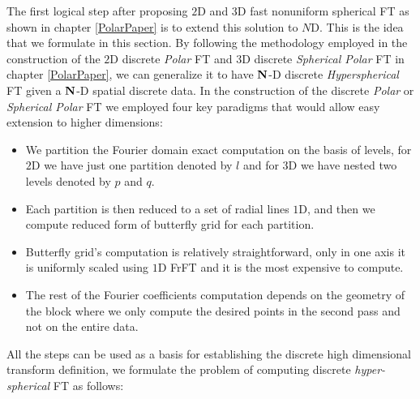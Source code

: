 \documentclass{UCF_ETD}
\begin{document}
The first logical step after proposing $2$D and $3$D fast nonuniform spherical FT as shown in chapter \ref{PolarPaper} is to extend this solution to $N$D. This is the idea that we formulate in this section. By following the methodology employed in the construction of the $2$D discrete \emph{Polar} FT and $3$D discrete \emph{Spherical Polar} FT in chapter \ref{PolarPaper}, we can generalize it to have ${\bf N}$-D discrete \emph{Hyperspherical} FT given a ${\bf N}$-D spatial discrete data. In the construction of the discrete \emph{Polar} or \emph{Spherical Polar} FT we employed four key paradigms that would allow easy extension to higher dimensions:
\begin{itemize}
\item We partition the Fourier domain exact computation on the basis of levels, for $2$D we have just one partition denoted by $l$ and for 3D we have nested two levels denoted by $p$ and $q$.
\item Each partition is then reduced to a set of radial lines $1$D, and then we compute reduced form of butterfly grid for each partition.
\item Butterfly grid's computation is relatively straightforward, only in one axis it is uniformly scaled using $1$D FrFT and it is the most expensive to compute.
\item The rest of the Fourier coefficients computation depends on the geometry of the block where we only compute the desired points in the second pass and not on the entire data.
\end{itemize}
All the steps can be used as a basis for establishing the discrete high dimensional transform definition, we formulate the problem of computing discrete \emph{hyper-spherical} FT as follows:
\end{document}
